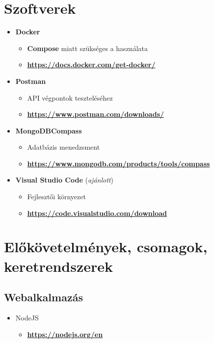 \section{Szoftverek}
\begin{itemize}
    \item \textbf{Docker}
    \begin{itemize}
        \item \textbf{Compose} miatt szükséges a használata
        \item \textbf{\href{https://docs.docker.com/get-docker/}{https://docs.docker.com/get-docker/}}
    \end{itemize}
    \item \textbf{Postman}
    \begin{itemize}
        \item API végpontok teszteléséhez
        \item \textbf{\href{https://www.postman.com/downloads/}{https://www.postman.com/downloads/}}
    \end{itemize}
    \item \textbf{MongoDBCompass}
    \begin{itemize}
        \item Adatbázis menedzsment
        \item \textbf{\href{https://www.mongodb.com/products/tools/compass}{https://www.mongodb.com/products/tools/compass}}
    \end{itemize}
    \item \textbf{Visual Studio Code} (\textit{ajánlott})
    \begin{itemize}
        \item Fejlesztői környezet
        \item \textbf{\href{https://code.visualstudio.com/download}{https://code.visualstudio.com/download}}
    \end{itemize}
\end{itemize}

\section{Előkövetelmények, csomagok, keretrendszerek}
\subsection{Webalkalmazás}
\begin{itemize}
    \item NodeJS
    \begin{itemize}
        \item \textbf{\href{https://nodejs.org/en}{https://nodejs.org/en}}
    \end{itemize}
\end{itemize}

